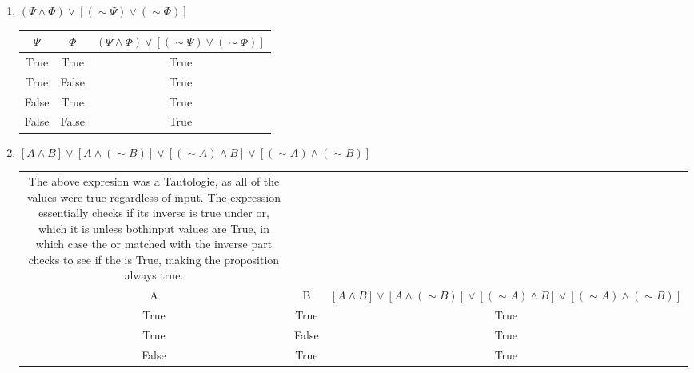 \documentclass{letter}
\begin{document}
\begin{description}
\begin{enumerate}
\begin{enumerate}
\begin{center}
\begin{tabular}{||c|c||}
                                    \end{tabular}
                                    \end{center}
				\item $(\Psi \wedge \Phi)\vee \left[(\sim \Psi)\vee(\sim \Phi)\right]$ \\ 
                                \begin{center}
                                  \begin{tabular}{||c|c|c||}
                                    \hline
                                    $\Psi$ & $\Phi$ & $(\Psi \wedge \Phi)\vee \left[(\sim \Psi)\vee(\sim \Phi)\right]$ \\ \hline
                                    True & True & True \\ \hline
                                    True & False & True \\ \hline
                                    False & True & True \\ \hline
                                    False & False & True \\ \hline
                                    \end{tabular}
                                    \end{center}
				\item $[A\wedge B]\vee [A\wedge (\sim B)] \vee [(\sim A)\wedge B] \vee [(\sim A)\wedge (\sim B)]$ \\ 
                                  \begin{center}
                                  \begin{tabular}{||c|c|c||}
                                    \hline
The above expresion was a Tautologie, as all of the values were true regardless of input. The expression essentially checks if its inverse is true under or, which it is unless bothinput values are True, in which case the or matched with the inverse part checks to see if the is True, making the proposition always true. \\
                                     A & B &  $[A\wedge B]\vee [A\wedge (\sim B)] \vee [(\sim A)\wedge B] \vee [(\sim A)\wedge (\sim B)]$ \\ \hline
                                    True & True & True \\ \hline
                                    True & False & True \\ \hline
                                    False & True & True \\ \hline

\end{tabular}
\end{center}
\end{enumerate}
\end{enumerate}
\end{description}
\end{document}

